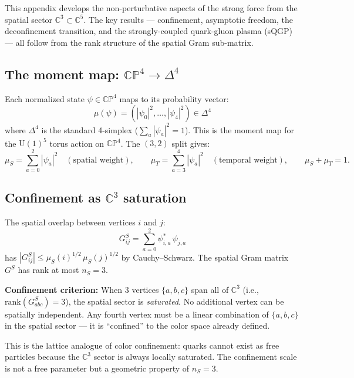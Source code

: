 \documentclass[12pt]{article}
\theoremstyle{remark}
\theoremstyle{definition}
\begin{document}
This appendix develops the non-perturbative aspects of the strong force from the spatial sector $\mathbb{C}^3 \subset \mathbb{C}^5$. The key results --- confinement, asymptotic freedom, the deconfinement transition, and the strongly-coupled quark-gluon plasma (sQGP) --- all follow from the rank structure of the spatial Gram sub-matrix.

\subsection{The moment map: $\mathbb{CP}^4 \to \Delta^4$}

Each normalized state $\psi \in \mathbb{CP}^4$ maps to its probability vector:
\begin{equation}
\mu(\psi) = (|\psi_0|^2, \ldots, |\psi_4|^2) \in \Delta^4
\end{equation}
where $\Delta^4$ is the standard 4-simplex ($\sum_a |\psi_a|^2 = 1$). This is the moment map for the $\text{U}(1)^5$ torus action on $\mathbb{CP}^4$. The $(3,2)$ split gives:
\begin{equation}
\mu_S = \sum_{a=0}^{2}|\psi_a|^2 \quad (\text{spatial weight}), \qquad \mu_T = \sum_{a=3}^{4}|\psi_a|^2 \quad (\text{temporal weight}), \qquad \mu_S + \mu_T = 1.
\end{equation}

\subsection{Confinement as $\mathbb{C}^3$ saturation}

The spatial overlap between vertices $i$ and $j$:
\begin{equation}
G^S_{ij} = \sum_{a=0}^{2} \psi^*_{i,a}\,\psi_{j,a}
\end{equation}
has $|G^S_{ij}| \leq \mu_S(i)^{1/2}\,\mu_S(j)^{1/2}$ by Cauchy--Schwarz. The spatial Gram matrix $G^S$ has rank at most $n_S = 3$.

\textbf{Confinement criterion:} When 3 vertices $\{a, b, c\}$ span all of $\mathbb{C}^3$ (i.e., $\text{rank}(G^S_{abc}) = 3$), the spatial sector is \emph{saturated}. No additional vertex can be spatially independent. Any fourth vertex must be a linear combination of $\{a, b, c\}$ in the spatial sector --- it is ``confined'' to the color space already defined.

This is the lattice analogue of color confinement: quarks cannot exist as free particles because the $\mathbb{C}^3$ sector is always locally saturated. The confinement scale is not a free parameter but a geometric property of $n_S = 3$.
\end{document}
